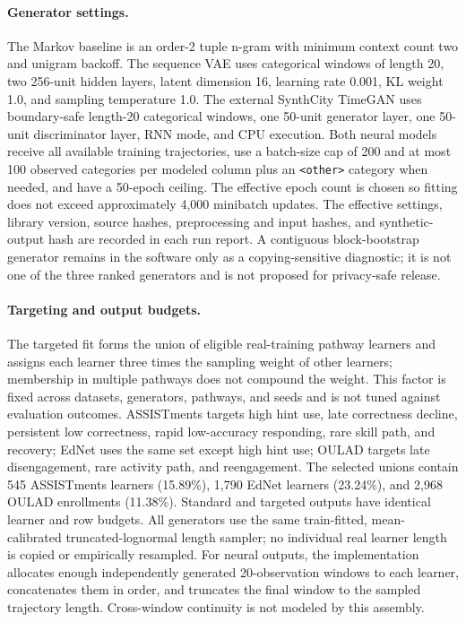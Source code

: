 \documentclass[10pt]{article}
\begin{document}
\paragraph{Generator settings.}
The Markov baseline is an order-2 tuple n-gram with minimum context count two
and unigram backoff. The sequence VAE uses categorical windows of length 20,
two 256-unit hidden layers, latent dimension 16, learning rate 0.001, KL weight
1.0, and sampling temperature 1.0. The external SynthCity TimeGAN uses
boundary-safe length-20 categorical windows, one 50-unit generator layer, one
50-unit discriminator layer, RNN mode, and CPU execution. Both neural models
receive all available training trajectories, use a batch-size cap of 200 and at
most 100 observed categories per modeled column plus an \texttt{<other>}
category when needed, and have a 50-epoch ceiling. The
effective epoch count is chosen so fitting does not exceed approximately 4,000
minibatch updates. The effective settings, library version, source
hashes, preprocessing and input hashes, and synthetic-output hash are recorded
in each run report. A contiguous block-bootstrap generator remains in the
software only as a copying-sensitive diagnostic; it is not one of the three
ranked generators and is not proposed for privacy-safe release.

\paragraph{Targeting and output budgets.}
The targeted fit forms the union of eligible real-training pathway learners and
assigns each learner three times the sampling weight of other learners;
membership in multiple pathways does not compound the weight. This factor is
fixed across datasets, generators, pathways, and seeds and is not tuned against
evaluation outcomes. ASSISTments targets high hint use, late correctness
decline, persistent low correctness, rapid low-accuracy responding, rare skill
path, and recovery; EdNet uses the same set except high hint use; OULAD targets late
disengagement, rare activity path, and reengagement. The selected unions contain
545 ASSISTments learners (15.89\%), 1,790 EdNet learners (23.24\%), and 2,968
OULAD enrollments (11.38\%). Standard and targeted outputs have identical
learner and row budgets. All generators use the same train-fitted,
mean-calibrated truncated-lognormal length sampler; no individual real learner
length is copied or empirically resampled. For neural outputs, the implementation allocates enough independently generated 20-observation windows to each learner, concatenates them in order, and truncates the final window to the sampled trajectory length. Cross-window continuity is not modeled by this assembly.
\end{document}
